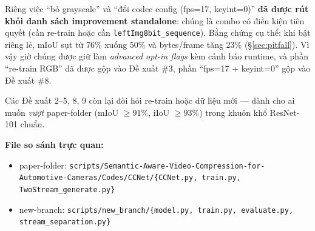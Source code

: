 \documentclass[12pt,a4paper]{article}
\begin{document}
Riêng việc ``bỏ grayscale'' và ``đổi codec config (fps=17, keyint=0)'' \textbf{đã
được rút khỏi danh sách improvement standalone}: chúng là combo có điều kiện tiên
quyết (cần re-train hoặc cần \texttt{leftImg8bit\_sequence}). Bằng chứng cụ thể:
khi bật riêng lẻ, mIoU sụt từ 76\% xuống 50\% và bytes/frame tăng 23\%
(\S\ref{sec:pitfall}). Vì vậy giờ chúng được giữ làm \emph{advanced opt-in
flags} kèm cảnh báo runtime, và phần ``re-train RGB'' đã được gộp vào Đề xuất
\#3, phần ``fps=17 + keyint=0'' gộp vào Đề xuất \#8.

Các Đề xuất 2--5, 8, 9 còn lại đòi hỏi re-train hoặc dữ liệu mới — dành cho ai
muốn \emph{vượt} paper-folder (mIoU $\ge 91\%$, iIoU $\ge 93\%$) trong khuôn khổ
ResNet-101 chuẩn.

\bigskip
\noindent\textbf{File so sánh trực quan:}
\begin{itemize}[leftmargin=2em]
  \item paper-folder: \texttt{scripts/Semantic-Aware-Video-Compression-for-Automotive-Cameras/Codes/CCNet/\{CCNet.py, train.py, TwoStream\_generate.py\}}
  \item new-branch: \texttt{scripts/new\_branch/\{model.py, train.py, evaluate.py, stream\_separation.py\}}
\end{itemize}
\end{document}
